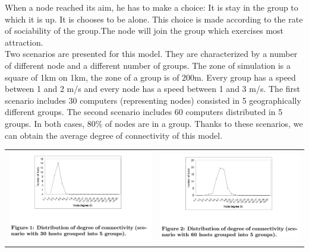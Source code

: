 When a node reached its aim, he has to make a choice:
It is stay in the group to which it is up.
It is chooses to be alone.
This choice is made according to the rate of sociability of the group.The node will join the group which exercises most attraction.\\

Two scenarios are presented for this model. They are characterized by a number of different node and a different number of groups.  The zone of simulation is a square of 1km on 1km, the zone of a group is of 200m. Every group has a speed between 1 and 2 m/s and every node has a speed between 1 and 3 m/s. The first scenario includes 30 computers (representing nodes) consisted in 5 geographically different groups. The second scenario includes 60 computers distributed in 5 groups. In both cases, 80\% of nodes are in a group. Thanks to these scenarios, we can obtain the average degree of connectivity of this model.\\

\begin{tabular}{cc}
   \includegraphics[scale=0.7]{../images/degreeConnectivitySocialNetwork30Nodes.png} &
   \includegraphics[scale=0.6]{../images/degreeConnectivitySocialNetwork60Nodes.png} \\
\end{tabular}

